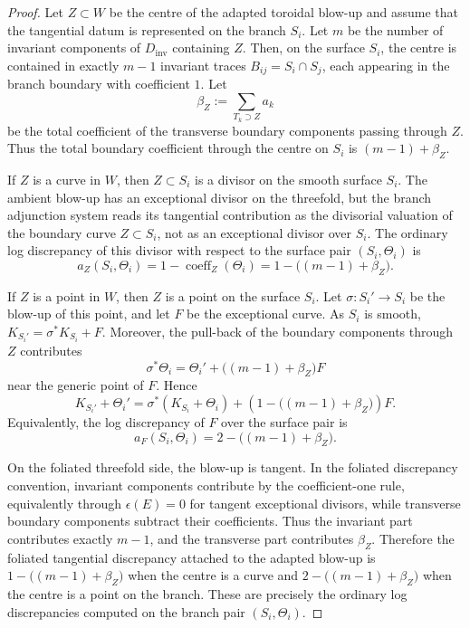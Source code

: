 \documentclass[11pt]{amsart}
\numberwithin{equation}{section}
\theoremstyle{plain}
\theoremstyle{definition}
\newcommand{\Dinv}{D_{\mathrm{inv}}}
\begin{document}
\begin{proof}
Let \(Z\subset W\) be the centre of the adapted toroidal blow-up and assume that the tangential datum is represented on the branch \(S_i\). Let \(m\) be the number of invariant components of \(\Dinv\) containing \(Z\). Then, on the surface \(S_i\), the centre is contained in exactly \(m-1\) invariant traces \(B_{ij}=S_i\cap S_j\), each appearing in the branch boundary with coefficient \(1\). Let
\[
\beta_Z:=\sum_{T_k\supset Z} a_k
\]
be the total coefficient of the transverse boundary components passing through \(Z\). Thus the total boundary coefficient through the centre on \(S_i\) is
$
(m-1)+\beta_Z.
$

If \(Z\) is a curve in \(W\), then \(Z\subset S_i\) is a divisor on the
smooth surface \(S_i\).  The ambient blow-up has an exceptional divisor on the
threefold, but the branch adjunction system reads its tangential contribution
as the divisorial valuation of the boundary curve \(Z\subset S_i\), not as an
exceptional divisor over \(S_i\).  The ordinary log discrepancy of this
divisor with respect to the surface pair \((S_i,\Theta_i)\) is
\[
a_Z(S_i,\Theta_i)
=
1-\operatorname{coeff}_Z(\Theta_i)
=
1-\bigl((m-1)+\beta_Z\bigr).
\]

If \(Z\) is a point in \(W\), then \(Z\) is a point on the surface \(S_i\). Let
$
\sigma:S_i'\longrightarrow S_i
$
be the blow-up of this point, and let \(F\) be the exceptional curve. As \(S_i\) is smooth,
$
K_{S_i'}=\sigma^*K_{S_i}+F.
$
Moreover, the pull-back of the boundary components through \(Z\) contributes
\[
\sigma^*\Theta_i
=
\Theta_i' + \bigl((m-1)+\beta_Z\bigr)F
\]
near the generic point of \(F\). Hence
\[
K_{S_i'}+\Theta_i'
=
\sigma^*(K_{S_i}+\Theta_i)
+
\left(1-\bigl((m-1)+\beta_Z\bigr)\right)F.
\]
Equivalently, the log discrepancy of \(F\) over the surface pair is
\[
a_F(S_i,\Theta_i)
=
2-\bigl((m-1)+\beta_Z\bigr).
\]

On the foliated threefold side, the blow-up is tangent. In the foliated discrepancy convention, invariant components contribute by the coefficient-one rule, equivalently through \(\epsilon(E)=0\) for tangent exceptional divisors, while transverse boundary components subtract their coefficients. Thus the invariant part contributes exactly \(m-1\), and the transverse part contributes \(\beta_Z\). Therefore the foliated tangential discrepancy attached to the adapted blow-up is
$
1-\bigl((m-1)+\beta_Z\bigr)
$
when the centre is a curve and
$
2-\bigl((m-1)+\beta_Z\bigr)
$
when the centre is a point on the branch. These are precisely the ordinary log discrepancies computed on the branch pair \((S_i,\Theta_i)\).
\end{proof}
\end{document}
